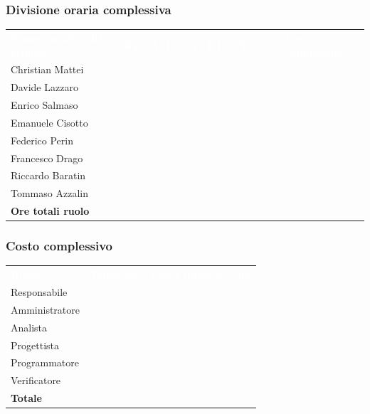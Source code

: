 \subsubsection{Divisione oraria complessiva}
{
	\renewcommand{\arraystretch}{2}
	\centering
	\begin{longtable}{ C{5cm} C{1cm} C{1cm} C{1cm} C{1cm} C{1cm} C{1cm} C{3cm}}
		\textcolor{white}{\textbf{Nome membro del gruppo}} & \textcolor{white}{\textbf{RE}} & \textcolor{white}{\textbf{AM}} & \textcolor{white}{\textbf{AN}} & \textcolor{white}{\textbf{PT}} & \textcolor{white}{\textbf{PR}} & \textcolor{white}{\textbf{VE}} & \textcolor{white}{\textbf{Ore complessive}}\\	
        
        Christian Mattei & & & & & & & \\
        Davide Lazzaro & & & & & & & \\
        Enrico Salmaso & & & & & & & \\
        Emanuele Cisotto & & & & & & & \\
        Federico Perin & & & & & & & \\
        Francesco Drago & & & & & & & \\
        Riccardo Baratin & & & & & & & \\
        Tommaso Azzalin & & & & & & & \\
        \textbf{Ore totali ruolo} & & & & & & & \\
		
	\end{longtable}
}
\subsubsection{Costo complessivo}
{
	\renewcommand{\arraystretch}{2}
	\centering
	\begin{longtable}{ C{3cm} C{2cm} C{4cm}}
		\textcolor{white}{\textbf{Ruolo}} & \textcolor{white}{\textbf{Totale ore}} & \textcolor{white}{\textbf{Costo Ruolo in euro}}\\	
        
        Responsabile & & \\
        Amministratore & & \\
        Analista & & \\
         Progettista & & \\
        Programmatore & & \\
        Verificatore & & \\
        \textbf{Totale} & & \\
		
	\end{longtable}
}



